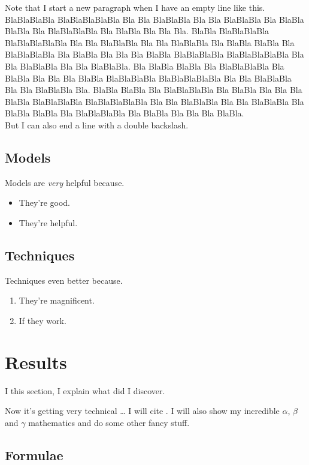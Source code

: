 \documentclass[11pt,twoside]{article}
\numberwithin{Theorem}{section}
\numberwithin{Definition}{section}
\numberwithin{Lemma}{section}
\numberwithin{Algorithm}{section}
\numberwithin{equation}{section}
\begin{document}
Note that I start a new paragraph when I have an empty line like this. BlaBlaBlaBla BlaBlaBlaBlaBla Bla Bla BlaBlaBla Bla Bla BlaBlaBla Bla BlaBla BlaBla Bla BlaBlaBlaBla Bla BlaBla Bla Bla Bla. BlaBla BlaBlaBlaBla BlaBlaBlaBlaBla Bla Bla BlaBlaBla Bla Bla BlaBlaBla Bla BlaBla BlaBla Bla BlaBlaBlaBla Bla BlaBla Bla Bla Bla BlaBla BlaBlaBlaBla BlaBlaBlaBlaBla Bla Bla BlaBlaBla Bla Bla BlaBlaBla. Bla BlaBla BlaBla Bla BlaBlaBlaBla Bla BlaBla Bla Bla Bla BlaBla BlaBlaBlaBla BlaBlaBlaBlaBla Bla Bla BlaBlaBla Bla Bla BlaBlaBla Bla. BlaBla BlaBla Bla BlaBlaBlaBla Bla BlaBla Bla Bla Bla BlaBla BlaBlaBlaBla BlaBlaBlaBlaBla Bla Bla BlaBlaBla Bla Bla BlaBlaBla Bla BlaBla BlaBla Bla BlaBlaBlaBla Bla BlaBla Bla Bla Bla BlaBla.\\
But I can also end a line with a double backslash.

\clearpage

\subsection{Models}
\label{sec:Models}

Models are \emph{very} helpful because.
\begin{itemize}
 \item They're good.
 \item They're helpful.
\end{itemize}
\clearpage

\subsection{Techniques}
\label{sec:Techniques}

Techniques even better because.
\begin{enumerate}
 \item They're magnificent.
 \item If they work.
\end{enumerate}
\clearpage

\section{Results}
\label{sec:results}
I this section, I explain what did I discover.

Now it's getting very technical \ldots{} I will cite \cite{shiina,groewe2001}. I will also show my incredible $\alpha$, $\beta$ and $\gamma$ mathematics and do some other fancy stuff.

\subsection{Formulae}
\end{document}

